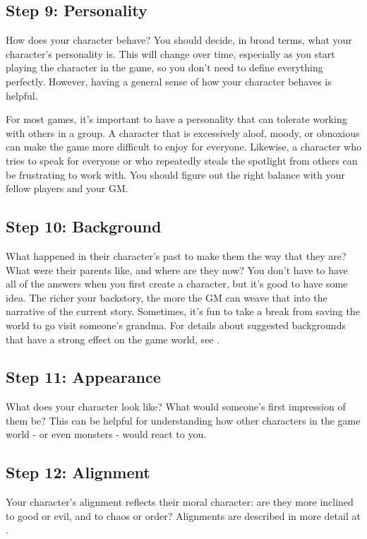     \subsection{Step 9: Personality}

        How does your character behave?
        You should decide, in broad terms, what your character's personality is.
        This will change over time, especially as you start playing the character in the game, so you don't need to define everything perfectly.
        However, having a general sense of how your character behaves is helpful.

        For most games, it's important to have a personality that can tolerate working with others in a group.
        A character that is excessively aloof, moody, or obnoxious can make the game more difficult to enjoy for everyone.
        Likewise, a character who tries to speak for everyone or who repeatedly steals the spotlight from others can be frustrating to work with.
        You should figure out the right balance with your fellow players and your GM.\@

    \subsection{Step 10: Background}
        What happened in their character's past to make them the way that they are?
        What were their parents like, and where are they now?
        You don't have to have all of the answers when you first create a character, but it's good to have some idea.
        The richer your backstory, the more the GM can weave that into the narrative of the current story.
        Sometimes, it's fun to take a break from saving the world to go visit someone's grandma.
        For details about suggested backgrounds that have a strong effect on the game world, see .

    \subsection{Step 11: Appearance}
        What does your character look like?
        What would someone's first impression of them be?
        This can be helpful for understanding how other characters in the game world - or even monsters - would react to you.

    \subsection{Step 12: Alignment}
        Your character's alignment reflects their moral character: are they more inclined to good or evil, and to chaos or order?
        Alignments are described in more detail at .

